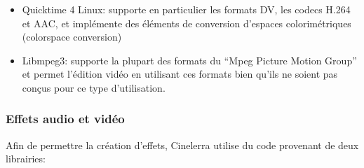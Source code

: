 \begin{itemize}

  \item {Quicktime 4 Linux: supporte en particulier les formats DV,
    les codecs H.264 et AAC, et implémente des éléments de conversion
    d'espaces colorimétriques (colorspace conversion)}

  \item {Libmpeg3: supporte la plupart des formats du ``Mpeg Picture
    Motion Group''  et permet l'édition
    vidéo en utilisant ces formats bien qu'ils ne soient pas conçus
    pour ce type d'utilisation.}

\end{itemize}

\subsubsection {Effets audio et vidéo}

Afin de permettre la création d'effets, Cinelerra utilise du  code
provenant de deux librairies:

